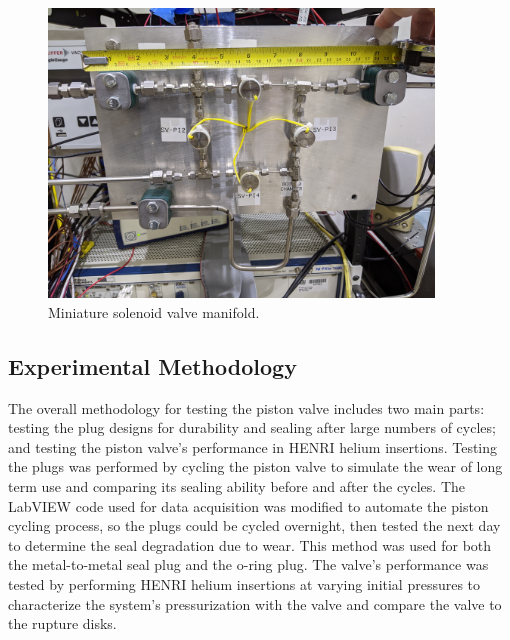 

%
\begin{figure}[htbp]
    \vspace{16pt}
    \centering
    \includegraphics[width=4.032in, height=3.024in]{experiment/photos/SV_manifold.jpg}
    \caption{Miniature solenoid valve manifold.}
    \label{fig:sv manifold}
    \vspace{16pt}
\end{figure}
%




\subsection{Experimental Methodology} \label{s:methodology}


The overall methodology for testing the piston valve includes two main parts: testing the plug designs for durability and sealing after large numbers of cycles; and testing the piston valve's performance in HENRI helium insertions. Testing the plugs was performed by cycling the piston valve to simulate the wear of long term use and comparing its sealing ability before and after the cycles. The LabVIEW code used for data acquisition was modified to automate the piston cycling process, so the plugs could be cycled overnight, then tested the next day to determine the seal degradation due to wear. This method was used for both the metal-to-metal seal plug and the o-ring plug. The valve's performance was tested by performing HENRI helium insertions at varying initial pressures to characterize the system's pressurization with the valve and compare the valve to the rupture disks.
